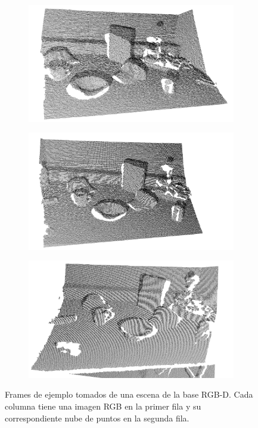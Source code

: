 \begin{figure}
    \begin{subfigure}[b]{0.3\textwidth}
        \includegraphics[width=\textwidth]{img/escena_rgbd/table_1_27_pcd.png}
    \end{subfigure}
    \quad
    \begin{subfigure}[b]{0.3\textwidth}
        \includegraphics[width=\textwidth]{img/escena_rgbd/table_1_34_pcd.png}
    \end{subfigure}
    \quad
    \begin{subfigure}[b]{0.3\textwidth}
        \includegraphics[width=\textwidth]{img/escena_rgbd/table_1_48_pcd.png}
    \end{subfigure}

    \caption{Frames de ejemplo tomados de una escena de la base RGB-D. Cada columna tiene una imagen RGB en la primer fila y su correspondiente nube de puntos en la segunda fila.}
    \label{escena_rgbd_base}
\end{figure}


